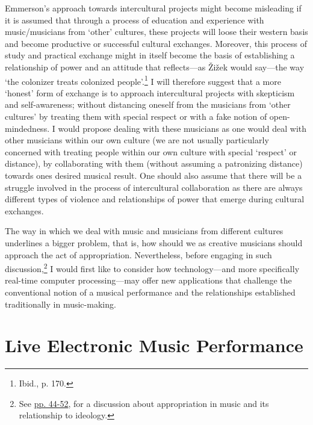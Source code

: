 Emmerson's approach towards intercultural projects might become misleading if it is assumed that through a process of education and experience with music/musicians from `other' cultures, these projects will loose their western basis and become productive or successful cultural exchanges. Moreover, this process of study and practical exchange might in itself become the basis of establishing a relationship of power and an attitude that reflects---as \v{Z}i\v{z}ek would say---the way `the colonizer treats colonized people'.\footnote{Ibid., p. 170.} I will therefore suggest that a more `honest' form of exchange is to approach intercultural projects with skepticism and self-awareness; without distancing oneself from the musicians from `other cultures' by treating them with special respect or with a fake notion of open-mindedness. I would propose dealing with these musicians as one would deal with other musicians within our own culture (we are not usually particularly concerned with treating people within our own culture with special `respect' or distance), by collaborating with them (without assuming a patronizing distance) towards ones desired musical result. One should also assume that there will be a struggle involved in the process of intercultural collaboration as there are always different types of violence and relationships of power that emerge during cultural exchanges. 

The way in which we deal with music and musicians from different cultures underlines a bigger problem, that is, how should we as creative musicians should approach the act of appropriation. Nevertheless, before engaging in such discussion,\footnote{See \hyperlink{appropriation}{pp. 44-52}, for  a discussion about appropriation in music and its relationship to ideology.} I would first like to consider how technology---and more specifically real-time computer processing---may offer new applications that challenge the conventional notion of a musical performance and the relationships established traditionally in music-making.

\section{Live Electronic Music Performance}

